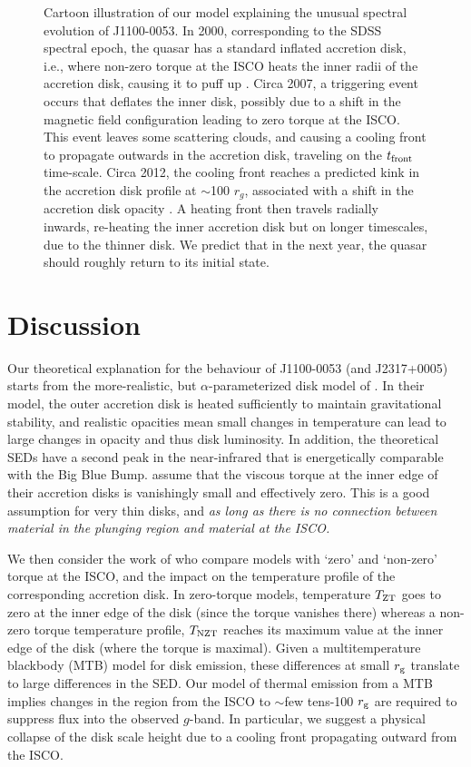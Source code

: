 \documentclass{nature}
\begin{document}
\begin{figure}
{    Cartoon illustration of our model explaining the unusual spectral evolution of J1100-0053. In 2000, corresponding to the SDSS spectral epoch, the quasar has a standard inflated accretion disk, i.e., where non-zero torque at the ISCO heats the inner radii of the accretion disk, causing it to puff up \citep[e.g.,][]{Zimmerman2005}. Circa 2007, a triggering event occurs that deflates the inner disk, possibly due to a shift in the magnetic field configuration leading to zero torque at the ISCO.  This event leaves some scattering clouds, and causing a cooling front to propagate outwards in the accretion disk, traveling on the $t_{\rm front}$ time-scale. Circa 2012, the cooling front reaches a predicted kink in the accretion disk profile at $\sim$100 $r_{g}$, associated with a shift in the accretion disk opacity \citep[e.g., Figure 2 of ][]{Sirko_Goodman2003}. A heating front then travels radially inwards, re-heating the inner accretion disk but on longer timescales, due to the thinner disk. We predict that in the next year, the quasar should roughly return to its initial state.}
  \label{fig:J110057_diskmodel}
\end{figure}

\section{Discussion} 
Our theoretical explanation for the behaviour of J1100-0053 (and
J2317+0005) starts from the more-realistic, but $\alpha$-parameterized
disk model of \cite{Sirko_Goodman2003}. In their model, 
the outer accretion disk is heated sufficiently to
maintain gravitational stability, and realistic opacities mean small
changes in temperature can lead to large changes in opacity and thus disk luminosity. 
In addition, the theoretical SEDs have a second peak
in the near-infrared that is energetically comparable with the Big
Blue Bump. 
\cite{Sirko_Goodman2003} assume
that the viscous torque at the inner edge of their accretion
disks is vanishingly small and effectively zero. This is a good
assumption for very thin disks, and
\emph{as long as there is no connection between material in the plunging
region and material at the ISCO.}

We then consider the work of
\cite{Zimmerman2005} who compare models with `zero' and `non-zero'
torque at the ISCO,
and the impact on the temperature profile of the corresponding accretion disk.
In zero-torque models, temperature $T_{\rm ZT}$ goes to zero at
the inner edge of the disk (since the torque vanishes there) whereas
a non-zero torque temperature profile, $T_{\rm NZT}$ reaches its
maximum value at the inner edge of the disk (where the torque is maximal).
Given a multitemperature blackbody (MTB) model for disk emission,
these differences
at small $r_{\rm g}$ translate to large differences in the SED. 
Our model of thermal emission from a MTB implies changes in the
region from the ISCO to $\sim$few tens-100 $r_{\rm g}$ are required to
suppress flux into the observed $g$-band. In particular, we suggest a
physical collapse of the disk scale height due to a cooling front
propagating outward from the ISCO.
\end{document}
